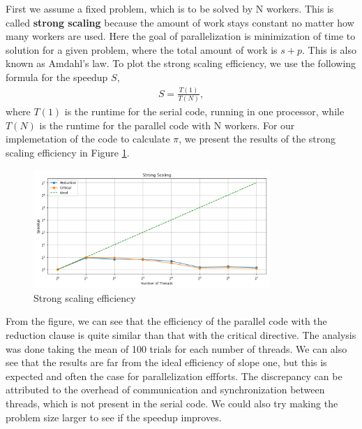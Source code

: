 \documentclass[unicode,11pt,a4paper,oneside,numbers=endperiod,openany]{scrartcl}
\begin{document}
\begin{enumerate}
    First we assume a fixed problem, which is to be solved by N workers. 
    This is called \textbf{strong scaling} because the amount of work stays constant no
    matter how many workers are used. Here the goal of parallelization is
    minimization of time to solution for a given problem, where the total amount
    of work is $s + p$. 
    This is also known as Amdahl's law.
    To plot the strong scaling efficiency, we use the following formula for the speedup $S$,
    \begin{align}
      S =  \frac{T(1)}{T(N)},
    \end{align}
    where $T(1)$ is the runtime for the serial code, running in one processor, while
    $T(N)$ is the runtime for the parallel code with N workers.
    For our implemetation of the code to calculate $\pi$, we present the results 
    of the strong scaling efficiency in Figure \ref{fig:strong-scaling}.
    \begin{figure}[h]
      \centering
      \includegraphics[width=0.8\textwidth]{../pi/strong_scaling_plot.png}
      \caption{Strong scaling efficiency}
      \label{fig:strong-scaling}
    \end{figure}
    From the figure, we can see that the efficiency of the parallel code with
    the reduction clause is quite similar than that with the critical directive.
    The analysis was done taking the mean of 100 trials for each number of
    threads.
    We can also see that the results are far from the ideal efficiency of slope
    one, but this is expected and often the case for parallelization effforts.
    The discrepancy can be attributed to the overhead of communication and
    synchronization between threads, which is not present in the serial code.
    We could also try making the problem size larger to see if the speedup improves.
    

\end{enumerate}
\end{document}
